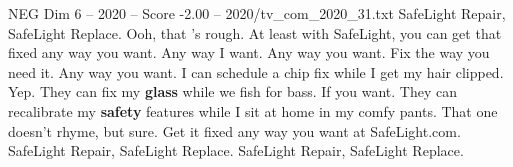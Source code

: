 \begin{textsample}{NEG Dim 6 – 2020 – Score -2.00 – 2020/tv\_com\_2020\_31.txt}  \label{ex:f6_neg_053}
SafeLight Repair, SafeLight Replace.
Ooh, that 's rough.
At least with SafeLight, you can get that fixed any way you want.
Any way I want.
Any way you want.
Fix the way you need it.
Any way you want.
I can schedule a chip fix while I get my hair clipped.
Yep.
They can fix my \textbf{glass} while we fish for bass.
If you want.
They can recalibrate my \textbf{safety} features while I sit at home in my comfy pants.
That one doesn't rhyme, but sure.
Get it fixed any way you want at SafeLight.com.
SafeLight Repair, SafeLight Replace.
SafeLight Repair, SafeLight Replace.

\end{textsample}
